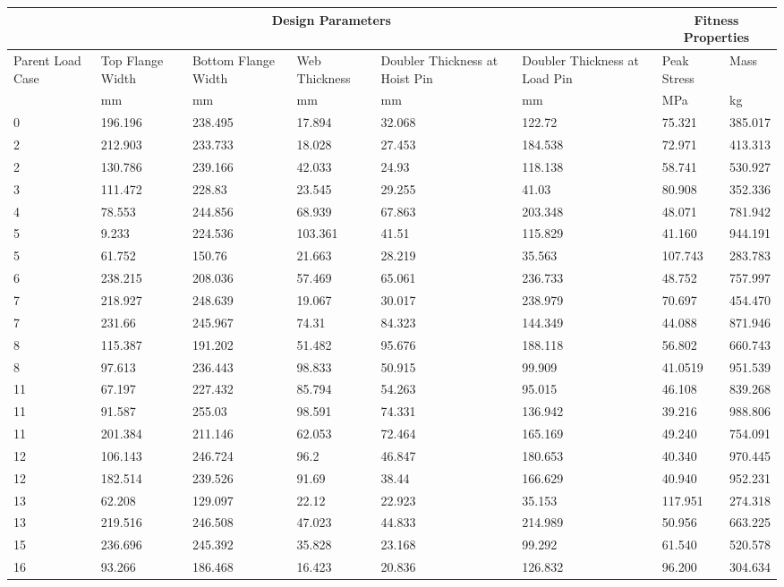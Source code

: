 \begin{table}[!htbp]
\small
\begin{tabular}{|p{1.5cm}p{1.5cm}p{1.5cm}p{1.4cm}p{2cm}p{2cm}||p{1.5cm}p{1.5cm}|}
\hline
\multicolumn{6}{|c||}{Design Parameters}&\multicolumn{2}{|c|}{Fitness Properties}\\
\hline
Parent Load Case&Top Flange Width&Bottom Flange Width&Web Thickness&Doubler Thickness at Hoist Pin&Doubler Thickness at Load Pin&Peak Stress& Mass\\
\hline
&mm&mm&mm&mm&mm&MPa&kg\\
\hline
0&196.196&238.495&17.894&32.068&122.72&75.321&385.017\\
2&212.903&233.733&18.028&27.453&184.538&72.971&413.313\\
2&130.786&239.166&42.033&24.93&118.138&58.741&530.927\\
3&111.472&228.83&23.545&29.255&41.03&80.908&352.336\\
4&78.553&244.856&68.939&67.863&203.348&48.071&781.942\\
5&9.233&224.536&103.361&41.51&115.829&41.160&944.191\\
5&61.752&150.76&21.663&28.219&35.563&107.743&283.783\\
6&238.215&208.036&57.469&65.061&236.733&48.752&757.997\\
7&218.927&248.639&19.067&30.017&238.979&70.697&454.470\\
7&231.66&245.967&74.31&84.323&144.349&44.088&871.946\\
8&115.387&191.202&51.482&95.676&188.118&56.802&660.743\\
8&97.613&236.443&98.833&50.915&99.909&41.0519&951.539\\
11&67.197&227.432&85.794&54.263&95.015&46.108&839.268\\
11&91.587&255.03&98.591&74.331&136.942&39.216&988.806\\
11&201.384&211.146&62.053&72.464&165.169&49.240&754.091\\
12&106.143&246.724&96.2&46.847&180.653&40.340&970.445\\
12&182.514&239.526&91.69&38.44&166.629&40.940&952.231\\
13&62.208&129.097&22.12&22.923&35.153&117.951&274.318\\
13&219.516&246.508&47.023&44.833&214.989&50.956&663.225\\
15&236.696&245.392&35.828&23.168&99.292&61.540&520.578\\
16&93.266&186.468&16.423&20.836&126.832&96.200&304.634\\

\end{tabular}
\end{table}
